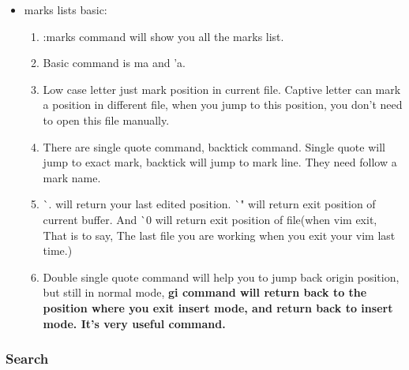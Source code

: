 \documentclass[a4paper,11pt,twoside]{book}
\begin{document}
\begin{itemize}

		\item marks lists basic:
		\begin{enumerate}
				\item :marks command will show you all the marks list. 

				\item Basic command is ma and 'a. 

				\item Low case letter just mark position in current file. Captive letter can mark a position in different file, when you jump to this position, you don't need to open this file manually.

				\item There are single quote command, backtick command. Single quote will jump to exact mark, backtick will jump to mark line. They need follow a mark name.

				\item \`{}. will return your last edited position.  \`{}" will return exit position of current buffer. And \`{}0 will return exit position of file(when vim exit, That is to say, The last file you are working when you exit your vim last time.) 

				\item Double single quote command will help you to jump back origin position, but still in normal mode, \textbf{gi command will return back to the position where you exit insert mode, and return back to insert mode. It's very useful command. }
				
\end{enumerate}
\end{itemize}
\subsubsection{Search}
\end{document}

